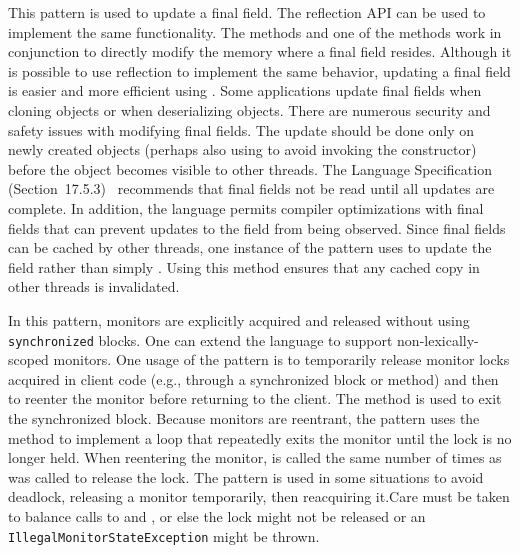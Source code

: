 \newcommand\foundinfinalfield{11}
\newcommand\usedbyfinalfield{7281}
\newcommand\mostusedfinalfield{\finalfieldmost}
\newcommand\membersfinalfield{\member{object\-Field\-Offset}; and, at least one method of the \smugroup{Heap Put} or \smugroup{Put Volatile} groups.}
\newcommand\namefinalfield{Update Final Fields}

%
{This pattern is used to update a final field.  }
{The reflection API can be used to implement the same functionality.}
{The  methods and one of the  methods work in conjunction to directly modify the memory where a final field resides.}
{Although it is possible to use reflection to implement the same behavior,
  updating a final field is easier and more efficient using \smu{}.
  Some applications update final fields when cloning objects
  or when deserializing objects.
}{
  There are numerous security and safety issues with modifying final
  fields. The update should be done only on newly created objects
  (perhaps also using  to avoid
  invoking the constructor) before the object becomes visible to
  other threads. The \java{} Language
  Specification (Section~17.5.3)~\cite{Gosling:2013:JLS:2462622}
  recommends that final fields not be read until all updates are
  complete. In addition, the language permits compiler optimizations
  with final fields that can prevent updates to the field from being
  observed.
  Since final fields can be cached by other threads, one instance of
  the pattern uses  to update the field rather than
  simply .
  Using this method ensures that any cached copy in other threads
  is invalidated.}

\newcommand\foundinmonitor{14}
\newcommand\usedbymonitor{7015}
\newcommand\mostusedmonitor{\monitormost}
\newcommand\membersmonitor{\member{monitor\-Enter}, \member{monitor\-Exit}}
\newcommand\namemonitor{Non-Lexically-Scoped Monitors}

%
{In this pattern, monitors are explicitly acquired and released without using
\texttt{synchronized} blocks.}
{One can extend the language to support non-lexically-scoped
monitors.}
{One usage of the pattern is to temporarily release monitor locks acquired
  in client code (e.g., through a synchronized block or method) and
  then to reenter the monitor before returning
  to the client. The  method is used to exit the
  synchronized block. Because monitors are reentrant, the pattern
  uses the method  to implement a loop
  that repeatedly exits the monitor
  until the lock is no longer held. When reentering the monitor,
   is called the same number of times
  as  was called to release the lock.
}{The pattern is used in some situations to avoid deadlock, releasing a monitor
temporarily, then reacquiring it.}{Care must be taken to balance calls to
 and , or else the lock might
not be released or an \texttt{Illegal\-Monitor\-State\-Exception} might be
thrown.}


